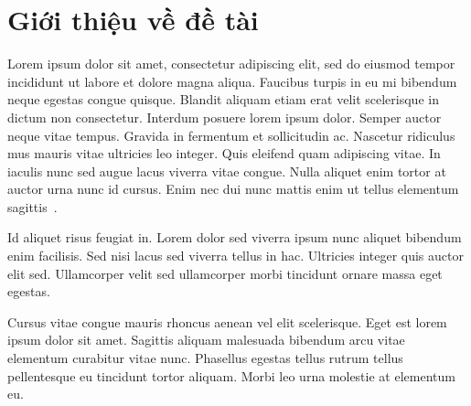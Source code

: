 \section{Giới thiệu về đề tài}
\label{sec:introduction}

Lorem ipsum dolor sit amet, consectetur adipiscing elit, sed do eiusmod tempor
incididunt ut labore et dolore magna aliqua. Faucibus turpis in eu mi bibendum
neque egestas congue quisque. Blandit aliquam etiam erat velit scelerisque in
dictum non consectetur. Interdum posuere lorem ipsum dolor. Semper auctor neque
vitae tempus. Gravida in fermentum et sollicitudin ac. Nascetur ridiculus mus
mauris vitae ultricies leo integer. Quis eleifend quam adipiscing vitae. In
iaculis nunc sed augue lacus viverra vitae congue. Nulla aliquet enim tortor at
auctor urna nunc id cursus. Enim nec dui nunc mattis enim ut tellus elementum
sagittis~\cite{wiki:skein_permutation}.

Id aliquet risus feugiat in. Lorem dolor sed viverra ipsum nunc aliquet
bibendum enim facilisis. Sed nisi lacus sed viverra tellus in hac. Ultricies
integer quis auctor elit sed. Ullamcorper velit sed ullamcorper morbi tincidunt
ornare massa eget egestas.

Cursus vitae congue mauris rhoncus aenean vel elit scelerisque. Eget est lorem
ipsum dolor sit amet. Sagittis aliquam malesuada bibendum arcu vitae elementum
curabitur vitae nunc. Phasellus egestas tellus rutrum tellus pellentesque eu
tincidunt tortor aliquam. Morbi leo urna molestie at elementum eu.